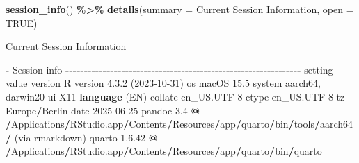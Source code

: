 \documentclass[
]{article}
\newenvironment{Shaded}{\begin{snugshade}}{\end{snugshade}}
\newcommand{\AttributeTok}[1]{\textcolor[rgb]{0.13,0.29,0.53}{#1}}
\newcommand{\ConstantTok}[1]{\textcolor[rgb]{0.56,0.35,0.01}{#1}}
\newcommand{\DecValTok}[1]{\textcolor[rgb]{0.00,0.00,0.81}{#1}}
\newcommand{\ErrorTok}[1]{\textcolor[rgb]{0.64,0.00,0.00}{\textbf{#1}}}
\newcommand{\FloatTok}[1]{\textcolor[rgb]{0.00,0.00,0.81}{#1}}
\newcommand{\FunctionTok}[1]{\textcolor[rgb]{0.13,0.29,0.53}{\textbf{#1}}}
\newcommand{\NormalTok}[1]{#1}
\newcommand{\SpecialCharTok}[1]{\textcolor[rgb]{0.81,0.36,0.00}{\textbf{#1}}}
\newcommand{\StringTok}[1]{\textcolor[rgb]{0.31,0.60,0.02}{#1}}
\begin{document}
\begin{Shaded}
\begin{Highlighting}[]
\FunctionTok{session\_info}\NormalTok{() }\SpecialCharTok{\%\textgreater{}\%}
\FunctionTok{details}\NormalTok{(}\AttributeTok{summary =} \StringTok{\textquotesingle{}Current Session Information\textquotesingle{}}\NormalTok{, }\AttributeTok{open =} \ConstantTok{TRUE}\NormalTok{)}
\end{Highlighting}
\end{Shaded}

{ Current Session Information }

\begin{Shaded}
\begin{Highlighting}[]

\SpecialCharTok{{-}}\NormalTok{ Session info }\SpecialCharTok{{-}{-}{-}{-}{-}{-}{-}{-}{-}{-}{-}{-}{-}{-}{-}{-}{-}{-}{-}{-}{-}{-}{-}{-}{-}{-}{-}{-}{-}{-}{-}{-}{-}{-}{-}{-}{-}{-}{-}{-}{-}{-}{-}{-}{-}{-}{-}{-}{-}{-}{-}{-}{-}{-}{-}{-}{-}{-}{-}{-}{-}{-}{-}}
\NormalTok{ setting  value}
\NormalTok{ version  R version }\DecValTok{4}\NormalTok{.}\FloatTok{3.2}\NormalTok{ (}\DecValTok{2023{-}10{-}31}\NormalTok{)}
\NormalTok{ os       macOS }\FloatTok{15.5}
\NormalTok{ system   aarch64, darwin20}
\NormalTok{ ui       X11}
 \FunctionTok{language}\NormalTok{ (EN)}
\NormalTok{ collate  en\_US.UTF}\DecValTok{{-}8}
\NormalTok{ ctype    en\_US.UTF}\DecValTok{{-}8}
\NormalTok{ tz       Europe}\SpecialCharTok{/}\NormalTok{Berlin}
\NormalTok{ date     }\DecValTok{2025{-}06{-}25}
\NormalTok{ pandoc   }\FloatTok{3.4} \SpecialCharTok{@} \ErrorTok{/}\NormalTok{Applications}\SpecialCharTok{/}\NormalTok{RStudio.app}\SpecialCharTok{/}\NormalTok{Contents}\SpecialCharTok{/}\NormalTok{Resources}\SpecialCharTok{/}\NormalTok{app}\SpecialCharTok{/}\NormalTok{quarto}\SpecialCharTok{/}\NormalTok{bin}\SpecialCharTok{/}\NormalTok{tools}\SpecialCharTok{/}\NormalTok{aarch64}\SpecialCharTok{/}\NormalTok{ (via rmarkdown)}
\NormalTok{ quarto   }\DecValTok{1}\NormalTok{.}\FloatTok{6.42} \SpecialCharTok{@} \ErrorTok{/}\NormalTok{Applications}\SpecialCharTok{/}\NormalTok{RStudio.app}\SpecialCharTok{/}\NormalTok{Contents}\SpecialCharTok{/}\NormalTok{Resources}\SpecialCharTok{/}\NormalTok{app}\SpecialCharTok{/}\NormalTok{quarto}\SpecialCharTok{/}\NormalTok{bin}\SpecialCharTok{/}\NormalTok{quarto}


\end{Highlighting}
\end{Shaded}
\end{document}
